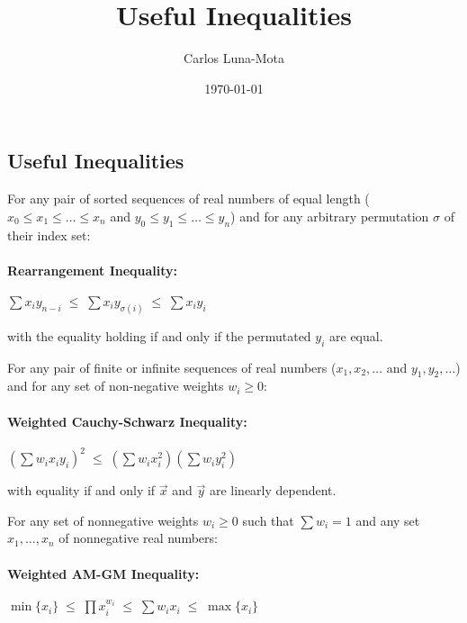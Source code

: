 \documentclass[11pt]{article}
\begin{document}
    \pagestyle{empty}
    \vspace*{-9em}

    \title{Useful Inequalities}
    \author{Carlos Luna-Mota}
    \date{\today}
    
    \begin{center}
        \section*{\Huge Useful Inequalities}
    \end{center}

    \vspace*{2em}

        For any pair of sorted sequences of real numbers of equal length ($x_0 \leq x_1 \leq \dots \leq x_n$ and $y_0 \leq y_1 \leq \dots \leq y_n$) and for any arbitrary permutation $\sigma$ of their index set:\bigskip

        \paragraph{Rearrangement Inequality:} $\displaystyle \boxed{\sum x_i y_{n-i} \;\leq\; \sum x_i y_{\sigma(i)} \;\leq\; \sum x_i y_i}$ \bigskip

        with the equality holding if and only if the permutated $y_i$ are equal. \bigskip

    \hrulefill \bigskip

        For any pair of finite or infinite sequences of real numbers ($x_1, x_2, \dots$ and $y_1, y_2, \dots$) and for any set of non-negative weights $w_i\geq0$:

        \paragraph{Weighted Cauchy-Schwarz Inequality:} $\displaystyle \boxed{\left( \sum w_i x_i y_i\right)^2 \;\leq\;\left(\sum w_i x^2_i\right) \left(\sum w_i y^2_i\right)}$ \bigskip

        with equality if and only if $\vec x$ and $\vec y$ are linearly dependent.

    \hrulefill \bigskip

        For any set of nonnegative weights $w_i \geq 0$ such that $\sum w_i = 1$ and any set $x_1, \dots, x_n$ of nonnegative real numbers:

        \paragraph{Weighted AM-GM Inequality:} $\displaystyle \boxed{{\min \{x_i\} \;\leq\;} \prod x_i^{w_i} \;\leq\; \sum w_i x_i {\;\leq\; \max \{x_i\}}}$ \bigskip
\end{document}
